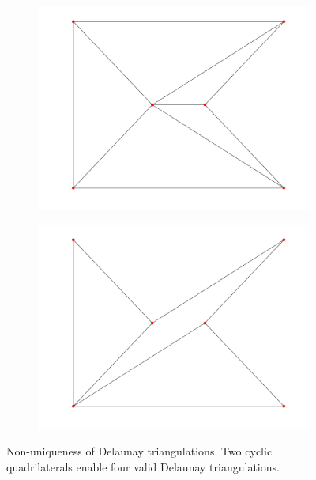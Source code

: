 \begin{figure}[ht]
\begin{subfigure}[b]{0.2\textwidth}
        \centering
        \includegraphics[width=\textwidth]{report/Images/Theory/triangulation/triangulation_delaunay2.png}
        \label{fig:triangulation-delaunay2}
    \end{subfigure}
    \hfill
    \begin{subfigure}[b]{0.2\textwidth}
        \centering
        \includegraphics[width=\textwidth]{report/Images/Theory/triangulation/triangulation_delaunay4.png}
        \label{fig:triangulation-delaunay4}
    \end{subfigure}
    \caption[Non-uniqueness of Delaunay triangulations]{Non-uniqueness of Delaunay triangulations. Two cyclic quadrilaterals enable four valid Delaunay triangulations.}
    \label{fig:non-unique-delaunay}
\end{figure}

